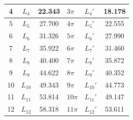 \documentclass{../../templates/Report}
\begin{document}
\begin{fullreportonly}
\begin{table}[H]
\begin{tabular}{|c|c|c|C{5em}|C{3em}|c|}
			                                                         & $L_4$                                                                & 22.343                                & $3\pi$                    & $L_4'$                                            & 18.178 \\
			                                                         & $L_5$                                                                & 27.700                                & $4\pi$                    & $L_5'$                                            & 22.555 \\
			                                                         & $L_6$                                                                & 31.326                                & $5\pi$                    & $L_6'$                                            &27.990  \\
			                                                         & $L_7$                                                                & 35.922                                & $6\pi$                    & $L_7'$                                            & 31.460 \\
			                                                         & $L_8$                                                                & 40.400                                & $7\pi$                    & $L_8'$                                            & 35.872 \\
			                                                         & $L_9$                                                                & 44.622                                & $8\pi$                    & $L_9'$                                            & 40.352 \\
			                                                        & $L_{10}$                                                               & 49.343                                & $9\pi$                    & $L_{10}'$                                           & 44.773 \\
			                                                        & $L_{11}$                                                               & 53.814                                & $10\pi$                    & $L_{11}'$                                           & 49.147 \\
			                                                        & $L_{12}$                                                               & 58.318                                & $11\pi$                    & $L_{12}'$                                           & 53.611 \\

\end{tabular}
\end{table}
\end{fullreportonly}
\end{document}
